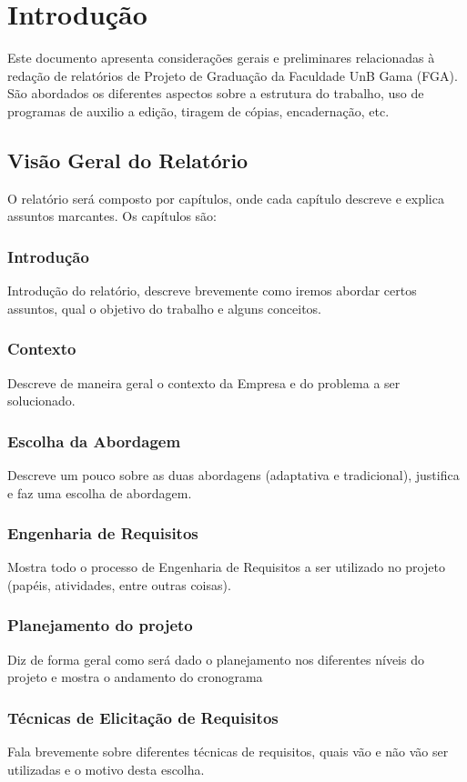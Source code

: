 \chapter[Introdução]{Introdução}

Este documento apresenta considerações gerais e preliminares relacionadas
à redação de relatórios de Projeto de Graduação da Faculdade UnB Gama
(FGA). São abordados os diferentes aspectos sobre a estrutura do trabalho,
uso de programas de auxilio a edição, tiragem de cópias, encadernação, etc.

\section{Visão Geral do Relatório}
O relatório será composto por capítulos, onde cada capítulo descreve e explica assuntos marcantes. Os capítulos são:

\subsection{Introdução}
Introdução do relatório, descreve brevemente como iremos abordar certos assuntos, qual o objetivo do trabalho e alguns conceitos.
\subsection{Contexto}
Descreve de maneira geral o contexto da Empresa e do problema a ser solucionado.
\subsection{Escolha da Abordagem}
Descreve um pouco sobre as duas abordagens (adaptativa e tradicional), justifica e faz uma escolha de abordagem.
\subsection{Engenharia de Requisitos}
Mostra todo o processo de Engenharia de Requisitos a ser utilizado no projeto (papéis, atividades, entre outras coisas).
\subsection{Planejamento do projeto}
Diz de forma geral como será dado o planejamento nos diferentes níveis do projeto e mostra o andamento do cronograma
\subsection{Técnicas de Elicitação de Requisitos}
Fala brevemente sobre diferentes técnicas de requisitos, quais vão e não vão ser utilizadas e o motivo desta escolha.
